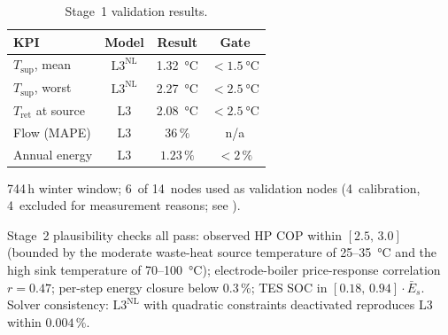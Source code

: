 \documentclass[a4paper,fleqn]{cas-dc}
\newcommand{\Lnl}{\mathrm{L3}^{\mathrm{NL}}}
\begin{document}
\begin{table}[!htbp]
\centering
\caption{Stage~1 validation results.}
\label{tab:validation_stage1}
\begin{threeparttable}
\footnotesize
\begin{tabular*}{\columnwidth}{@{\extracolsep{\fill}} l c c c @{}}
\toprule
KPI & Model & Result & Gate \\
\midrule
$T_{\mathrm{sup}}$, mean\tnote{a}
  & $\Lnl$ & \SI{1.32}{\celsius} & ${<}\SI{1.5}{\celsius}$ \\
$T_{\mathrm{sup}}$, worst\tnote{a}
  & $\Lnl$ & \SI{2.27}{\celsius} & ${<}\SI{2.5}{\celsius}$ \\
$T_{\mathrm{ret}}$ at source
  & L3     & \SI{2.08}{\celsius} & ${<}\SI{2.5}{\celsius}$ \\
Flow (MAPE)
  & L3     & $36\,\%$            & n/a \\
Annual energy
  & L3     & $1.23\,\%$          & ${<}2\,\%$ \\
\bottomrule
\end{tabular*}
\begin{tablenotes}\footnotesize
  \item[a] 744\,h winter window; 6~of 14~nodes used as
    validation nodes (4~calibration, 4~excluded for measurement
    reasons; see ).
\end{tablenotes}
\end{threeparttable}
\end{table}

Stage~2 plausibility checks all pass: observed HP COP within
$[2.5,\,3.0]$ (bounded by the moderate waste-heat source
temperature of 25--\SI{35}{\celsius} and the high sink temperature
of 70--\SI{100}{\celsius}); electrode-boiler price-response
correlation $r = 0.47$; per-step energy closure below 0.3\,\%; TES
SOC in $[0.18,\,0.94] \cdot \bar{E}_s$. Solver consistency:
$\Lnl$ with quadratic constraints deactivated reproduces L3 within
$0.004\,\%$.
\end{document}
